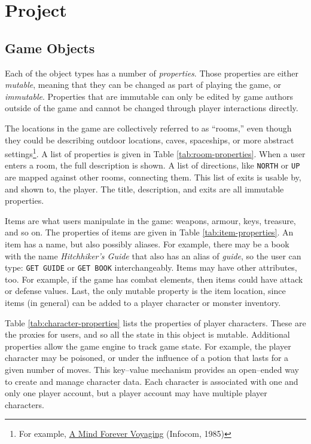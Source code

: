 \documentclass{article}
\newcommand{\enterProblemHeader}[1]{
}
\newcommand{\exitProblemHeader}[1]{
\nobreak\extramarks{#1}{}\nobreak
}
\newcounter{homeworkProblemCounter} %
\newcommand{\homeworkProblemName}{}
\newenvironment{homeworkProblem}[1][Problem \arabic{homeworkProblemCounter}]{ %
\stepcounter{homeworkProblemCounter} %
\renewcommand{\homeworkProblemName}{#1} %
\section{\homeworkProblemName} %
\enterProblemHeader{\homeworkProblemName} %
}{
\exitProblemHeader{\homeworkProblemName} %
}
\newcommand{\homeworkSectionName}{}
\newenvironment{homeworkSection}[1]{ %
\renewcommand{\homeworkSectionName}{#1} %
\subsection{\homeworkSectionName} %
\enterProblemHeader{\homeworkProblemName\ [\homeworkSectionName]} %
}{
\enterProblemHeader{\homeworkProblemName} %
}
\begin{document}
\begin{homeworkProblem}[Project]
\begin{homeworkSection}{Game Objects}
	Each of the object types has a number of \textit{properties}. Those properties are either \textit{mutable}, meaning that they can be changed as part of playing the game, or \textit{immutable}. Properties that are immutable can only be edited by game authors outside of the game and cannot be changed through player interactions directly.

	The locations in the game are collectively referred to as ``rooms,'' even though they could be describing outdoor locations, caves, spaceships, or more abstract settings\footnote{For example, \href{https://en.wikipedia.org/wiki/A_Mind_Forever_Voyaging}{A Mind Forever Voyaging} (Infocom, 1985)}. A list of properties is given in Table \ref{tab:room-properties}. When a user enters a room, the full description is shown. A list of directions, like \texttt{NORTH} or \texttt{UP} are mapped against other rooms, connecting them. This list of exits is usable by, and shown to, the player. The title, description, and exits are all immutable properties.

	Items are what users manipulate in the game: weapons, armour, keys, treasure, and so on. The properties of items are given in Table \ref{tab:item-properties}. An item has a name, but also possibly aliases. For example, there may be a book with the name \textit{Hitchhiker's Guide} that also has an alias of \textit{guide}, so the user can type: \texttt{GET GUIDE} or \texttt{GET BOOK} interchangeably. Items may have other attributes, too. For example, if the game has combat elements, then items could have attack or defense values. Last, the only mutable property is the item location, since items (in general) can be added to a player character or monster inventory.

	Table \ref{tab:character-properties} lists the properties of player characters. These are the proxies for users, and so all the state in this object is mutable. Additional properties allow the game engine to track game state. For example, the player character may be poisoned, or under the influence of a potion that lasts for a given number of moves. This key--value mechanism provides an open--ended way to create and manage character data. Each character is associated with one and only one player account, but a player account may have multiple player characters.


\end{homeworkSection}
\end{homeworkProblem}
\end{document}
